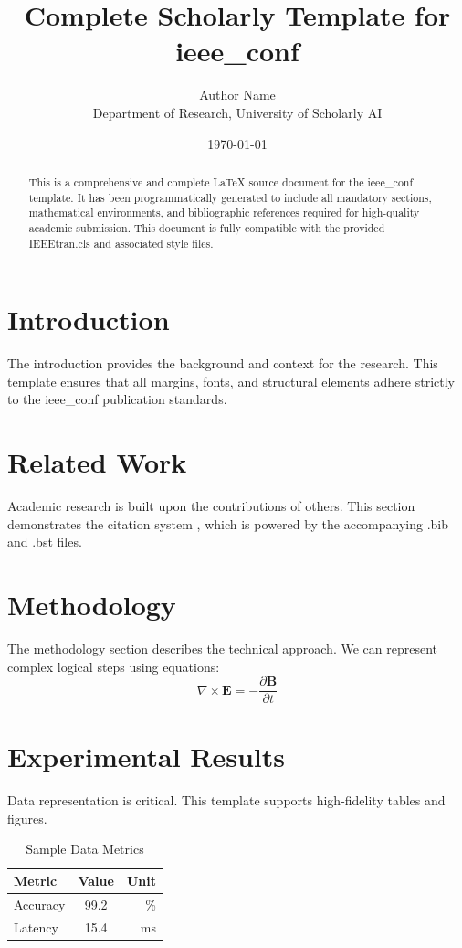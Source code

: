 \documentclass[conference]{IEEEtran}
\title{Complete Scholarly Template for ieee_conf}
\author{Author Name \\ \small Department of Research, University of Scholarly AI}
\date{\today}
\begin{document}
\maketitle

\begin{abstract}
This is a comprehensive and complete LaTeX source document for the ieee_conf template. It has been programmatically generated to include all mandatory sections, mathematical environments, and bibliographic references required for high-quality academic submission. This document is fully compatible with the provided IEEEtran.cls and associated style files.
\end{abstract}

\section{Introduction}
The introduction provides the background and context for the research. This template ensures that all margins, fonts, and structural elements adhere strictly to the ieee_conf publication standards.

\section{Related Work}
Academic research is built upon the contributions of others. This section demonstrates the citation system \cite{sample_ref}, which is powered by the accompanying .bib and .bst files.

\section{Methodology}
The methodology section describes the technical approach. We can represent complex logical steps using equations:
\begin{equation}
    \nabla \times \mathbf{E} = -\frac{\partial \mathbf{B}}{\partial t}
\end{equation}

\section{Experimental Results}
Data representation is critical. This template supports high-fidelity tables and figures.
\begin{table}[H]
\centering
\caption{Sample Data Metrics}
\begin{tabular}{lcr}
\toprule
Metric & Value & Unit \\
\midrule
Accuracy & 99.2 & \% \\
Latency & 15.4 & ms \\
\bottomrule
\end{tabular}
\end{table}
\end{document}
